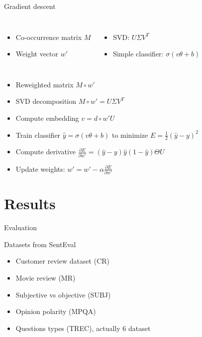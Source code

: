 \documentclass[xcolor={table}]{beamer}
\begin{document}
\begin{frame}{Gradient descent}
    \begin{columns}
    \begin{itemize}
        \item Co-occurrence matrix $M$
        \item Weight vector $w'$
    \end{itemize}
    \begin{itemize}
        \item SVD: $U \Sigma V^T$
        \item Simple classifier: $\sigma (v \theta + b)$
    \end{itemize}
    \end{columns}

    \begin{block}{}
    \begin{itemize}
        \item Reweighted matrix $M \circ w'$
        \item SVD decomposition $M \circ w' = U \Sigma V^T$
        \item Compute embedding $v = d \circ w' U$
        \item Train classifier $\hat{y} = \sigma (v \theta + b)$ to minimize $E = \frac{1}{2}(\hat{y}-y)^2$
        \item Compute derivative $\frac{\partial E}{\partial w'} = (\hat{y} -y) \hat{y} (1-\hat{y})\Theta U$
        \item Update weights: $w' = w' - \alpha \frac{\partial E}{\partial w'}$
    \end{itemize}    
    \end{block}
\end{frame} 

\section{Results}
\begin{frame}{Evaluation}
    \begin{block}{Datasets from SentEval \cite{conneau2017supervised}}
        \begin{itemize}
            \item Customer review dataset (CR)
            \item Movie review (MR)
            \item Subjective vs objective (SUBJ)
            \item Opinion polarity (MPQA)
            \item Questions types (TREC), actually $6$ dataset
        \end{itemize}
    \end{block}
    
\end{frame} 
\end{document}
